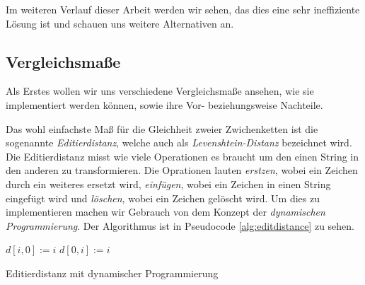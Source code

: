\documentclass[sigconf]{acmart}
\DeclarePairedDelimiter\abs{\lvert}{\rvert}
\begin{document}
Im weiteren Verlauf dieser Arbeit werden wir sehen, das dies eine sehr
ineffiziente Lösung ist und schauen uns weitere Alternativen an.


\subsection*{Vergleichsmaße}
Als Erstes wollen wir uns verschiedene Vergleichsmaße ansehen, wie sie 
implementiert werden können, sowie ihre Vor- beziehungsweise Nachteile.

Das wohl einfachste Maß für die Gleichheit zweier Zwichenketten
ist die sogenannte \emph{Editierdistanz}, welche auch als
\emph{Levenshtein-Distanz} bezeichnet wird. Die Editierdistanz
misst wie viele Operationen es braucht um den einen String in den 
anderen zu transformieren. Die Oprationen lauten \emph{erstzen}, wobei
ein Zeichen durch ein weiteres ersetzt wird, \emph{einfügen}, wobei ein
Zeichen in einen String eingefügt wird und \emph{löschen}, wobei ein 
Zeichen gelöscht wird. Um dies zu implementieren machen wir Gebrauch
von dem Konzept der \emph{dynamischen Programmierung}. Der Algorithmus ist
in Pseudocode \ref{alg:editdistance} zu sehen.


  \begin{algorithm}
    \begin{algorithmic}[1]
      
        \State $d[i,0] := i$
      \EndFor
        \State $d[0,i] := i$
      \EndFor

          \Else
          \EndIf
          \State {}
        \EndFor
      \EndFor
    
      \EndProcedure
      
    \end{algorithmic}
    \caption{Editierdistanz mit dynamischer Programmierung}
    \label{alg:editdistance}
    \end{algorithm}
\end{document}
